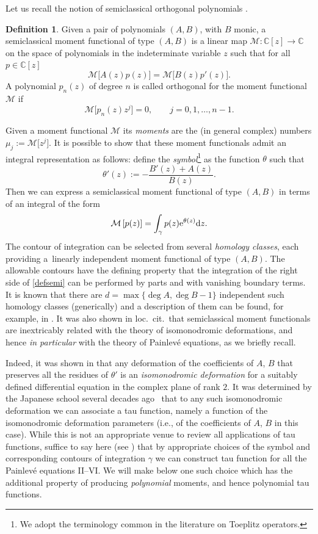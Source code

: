 \documentclass[pdftex]{sigma}
\numberwithin{equation}{section}
\theoremstyle{definition}
\newtheorem{Definition}[Theorem]{Definition}
\def\le{\left}
\def\ri{\right}
\def \d{{\mathrm d}}
\def\be{\begin{equation}}
\def\ee{\end{equation}}
\def\M{{\mathcal M}}
\def\C{{\mathbb C}}
\begin{document}
Let us recall the notion of semiclassical orthogonal polynomials \cite{Marcellan0,Marcellan,Maroni,Shohat}.
\begin{Definition}\label{defSOP}
Given a pair of polynomials $(A,B)$, with $B$ monic, a semiclassical moment functional of type $(A,B)$ is a linear map $\M\colon\C[z]\to \C$ on the space of polynomials in the indeterminate variable $z$ such that for all $p\in \C[z]$
\be
\label{defsemi}
\M\big[A(z) p(z)\big] = \M \big[B(z) p'(z)\big].
\ee
A polynomial $p_n(z)$ of degree $n$ is called {\rm orthogonal} for the moment functional $\mathcal M$ if
\[
\M\big[p_n(z) z^j\big]=0, \qquad j=0,1,\dots, n-1.
\]
\end{Definition}
Given a moment functional $\M$ its {\it moments} are the (in general complex) numbers
$
\mu_j:= \mathcal M\big[z^j\big]$.
 It is possible to show that these moment functionals admit an integral representation as follows: define the {\it symbol}\footnote{We adopt the terminology common in the literature on Toeplitz operators. } as the function $\theta$ such that
\[%
\theta'(z):= -\frac {B'(z)+A(z)}{B(z)}.
\]
Then we can express a semiclassical moment functional of type $(A,B)$ in terms of an integral of the form
\[
\M\le[p(z)\ri] = \int_\gamma p(z) {\rm e}^{\theta(z)} \d z.
\]
The contour of integration can be selected from several {\it homology classes}, each providing a~linearly independent moment functional of type $(A,B)$. The allowable contours have the defining property that the integration of the right side of \eqref{defsemi} can be performed by parts and with vanishing boundary terms.
It is known that there are $d = \max\{\deg A, \deg B-1\}$ independent such homology classes (generically) and a description of them can be found, for example, in \cite{Bertola:Semiiso}.
It was also shown in loc.\ cit.\ that semiclassical moment functionals are inextricably related with the theory of isomonodromic deformations, and hence {\it in particular} with the theory of Painlev\'e equations, as we briefly recall.

Indeed, it was shown in \cite{Bertola:Semiiso} that any deformation of the coefficients of $A$, $B$ that preserves all the residues of $\theta'$ is an {\it isomonodromic deformation} for a suitably defined differential equation in the complex plane of rank $2$. It was determined by the Japanese school several decades ago~\cite{JMU1,JMU2} that to any such isomonodromic deformation we can associate a tau function, namely a function of the isomonodromic deformation parameters (i.e., of the coefficients of $A$, $B$ in this case). While this is not an appropriate venue to review all applications of tau functions, suffice to say here (see \cite[Remark~5.3]{Bertola:Semiiso}) that by appropriate choices of the symbol and corresponding contours of integration $\gamma$ we can construct tau function for all the Painlev\'e equations II--VI. We will make below one such choice which has the additional property of producing {\it polynomial} moments, and hence polynomial tau functions.
\end{document}
